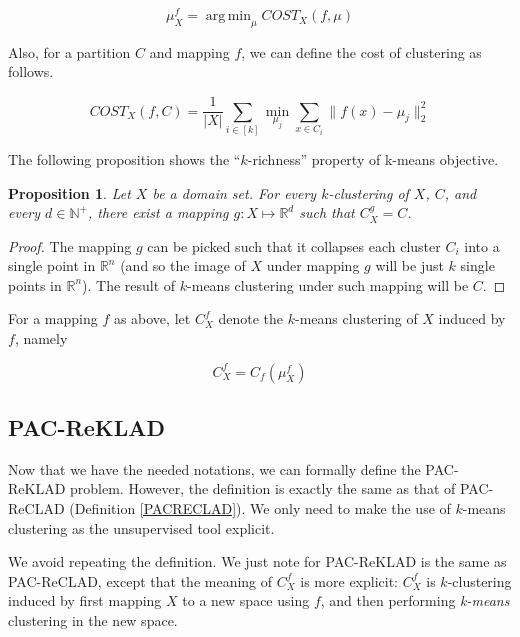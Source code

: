 \documentclass[letterpaper,12pt,titlepage,oneside,final]{book}
\DeclareMathOperator*{\argmin}{arg\,min}
\newtheorem{proposition}{Proposition}
\begin{document}
\begin{equation}
\mu^f_{X} = \argmin_{\mu} COST_{X}(f,\mu)
\end{equation}

Also, for a partition $C$ and mapping $f$, we can define the cost of clustering as follows.

\begin{equation}
COST_{X}(f, C) = \frac{1}{|X|} \sum_{i \in [k]} \min_{\mu_j} \sum_{x \in C_i} \|f(x)-\mu_j\|_2^2
\end{equation}



The following proposition shows the ``$k$-richness'' property of k-means objective.

\begin{proposition} Let $X$ be a domain set. For every $k$-clustering of $X$, $C$, and every $d\in \mathbb{N}^+$, there exist a mapping $g: X \mapsto \mathbb{R}^d$ such that $C^g_X = C$. 
\end{proposition}
\begin{proof} The mapping $g$ can be picked such that it collapses each cluster $C_i$ into a single point in $\mathbb{R}^n$ (and so the image of $X$ under mapping $g$ will be just $k$ single points in $\mathbb{R}^n$). The result of $k$-means clustering under such mapping will be $C$.
\end{proof}

For a mapping $f$ as above, let $C^f_{X}$ denote the $k$-means clustering of $X$ induced by $f$, namely  

\begin{equation}
C^f_{X}=C_f(\mu^f_{X})
\end{equation}


\subsection{PAC-ReKLAD}

Now that we have the needed notations, we can formally define the PAC-ReKLAD problem. However, the definition is exactly the same as that of PAC-ReCLAD (Definition \ref{PACRECLAD}). We only need to make the use of $k$-means clustering as the unsupervised tool explicit.

We avoid repeating the definition. We just note for PAC-ReKLAD is the same as PAC-ReCLAD, except that the meaning of $C^f_{X}$ is more explicit: $C^f_{X}$ is $k$-clustering induced by first mapping $X$ to a new space using $f$, and then performing \emph{k-means} clustering in the new space.
\end{document}
